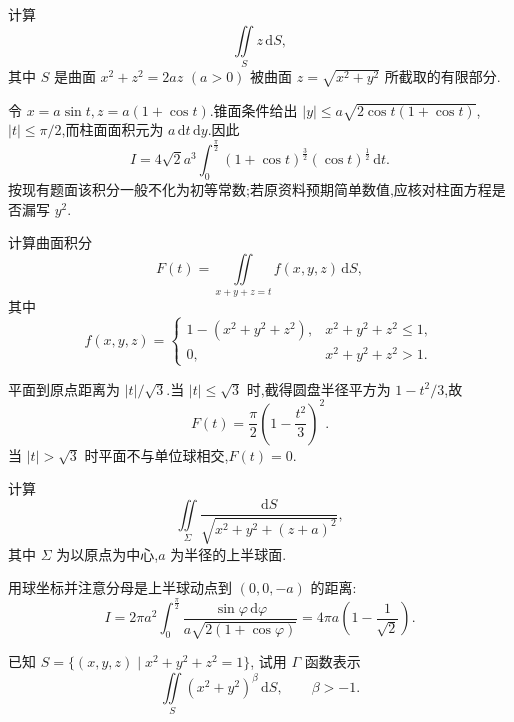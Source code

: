 \begin{example}
    计算
    \[
        \displaystyle\iint\limits_Sz\,\mathrm{d}S,
    \]
    其中 $S$ 是曲面 $x^2+z^2=2az$ $(a>0)$ 被曲面 $z=\sqrt{x^2+y^2}$ 所截取的有限部分.
\end{example}
\exampleblank

\begin{solution}
    令 $x=a\sin t,z=a(1+\cos t)$.锥面条件给出
    $|y|\leq a\sqrt{2\cos t(1+\cos t)}$,$|t|\leq\pi/2$,而柱面面积元为 $a\,\mathrm{d}t\,\mathrm{d}y$.因此
    \[
        I=4\sqrt{2}a^3\int_0^{\frac{\pi}{2}}(1+\cos t)^{\frac{3}{2}}(\cos t)^{\frac{1}{2}}\,\mathrm{d}t.
    \]
    按现有题面该积分一般不化为初等常数;若原资料预期简单数值,应核对柱面方程是否漏写 $y^2$.
\end{solution}

\begin{example}
    计算曲面积分
    \[
        F(t)=\iint\limits_{x+y+z=t}f(x,y,z)\,\mathrm{d}S,
    \]
    其中
    \[
        f(x,y,z)=
        \begin{cases}
            1-(x^2+y^2+z^2), & x^2+y^2+z^2\leq1, \\
            0,               & x^2+y^2+z^2>1.
        \end{cases}
    \]
\end{example}
\exampleblank

\begin{solution}
    平面到原点距离为 $|t|/\sqrt{3}$.当 $|t|\leq\sqrt{3}$ 时,截得圆盘半径平方为 $1-t^2/3$,故
    \[
        F(t)=\dfrac{\pi}{2}\left(1-\dfrac{t^2}{3}\right)^2.
    \]
    当 $|t|>\sqrt{3}$ 时平面不与单位球相交,$F(t)=0$.
\end{solution}

\begin{example}
    计算
    \[
        \displaystyle\iint\limits_\Sigma\dfrac{\mathrm{d}S}{\sqrt{x^2+y^2+(z+a)^2}},
    \]
    其中 $\Sigma$ 为以原点为中心,$a$ 为半径的上半球面.
\end{example}
\exampleblank

\begin{solution}
    用球坐标并注意分母是上半球动点到 $(0,0,-a)$ 的距离:
    \[
        I=2\pi a^2\int_0^{\frac{\pi}{2}}\dfrac{\sin\varphi\,\mathrm{d}\varphi}{a\sqrt{2(1+\cos\varphi)}}
        =4\pi a\left(1-\dfrac{1}{\sqrt{2}}\right).
    \]
\end{solution}

\begin{example}
    已知 $S=\{(x,y,z)\mid x^2+y^2+z^2=1\}$, 试用 $\Gamma$ 函数表示
    \[
        \displaystyle\iint\limits_S(x^2+y^2)^\beta\,\mathrm{d}S,
        \qquad \beta>-1.
    \]
\end{example}
\exampleblank

